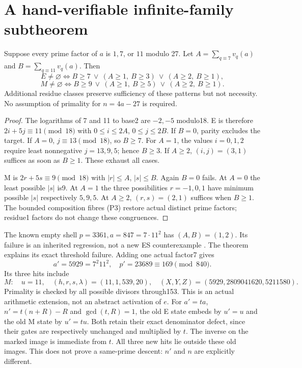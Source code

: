 \section{A hand-verifiable infinite-family subtheorem}
\begin{theorem}
Suppose every prime factor of $a$ is $1,7$, or $11$ modulo 27. Let
$A=\sum_{q\equiv7}v_q(a)$ and $B=\sum_{q\equiv11}v_q(a)$. Then
\[
 \boxed{
 E\ne\varnothing\iff
 B\ge7\ \lor\ (A\ge1,\ B\ge3)\ \lor\ (A\ge2,\ B\ge1),}
 \tag{T1}
\]
\[
 \boxed{
 M\ne\varnothing\iff
 B\ge9\ \lor\ (A\ge1,\ B\ge5)\ \lor\ (A\ge2,\ B\ge1).}
 \tag{T2}
\]
Additional residue classes preserve sufficiency of these patterns but not
necessity. No assumption of primality for $n=4a-27$ is required.
\end{theorem}
\begin{proof}
The logarithms of 7 and 11 to base2 are $-2,-5$ modulo18. E is therefore
$2i+5j\equiv11\pmod{18}$ with $0\le i\le2A$, $0\le j\le2B$.
If $B=0$, parity excludes the target. If $A=0$, $j\equiv13\pmod{18}$,
so $B\ge7$. For $A=1$, the values $i=0,1,2$ require least nonnegative
$j=13,9,5$; hence $B\ge3$. If $A\ge2$, $(i,j)=(3,1)$ suffices as soon
as $B\ge1$. These exhaust all cases.

M is $2r+5s\equiv9\pmod{18}$ with $|r|\le A$, $|s|\le B$.
Again $B=0$ fails. At $A=0$ the least possible $|s|$ is9. At $A=1$
the three possibilities $r=-1,0,1$ have minimum possible $|s|$ respectively
$5,9,5$. At $A\ge2$, $(r,s)=(2,1)$ suffices when $B\ge1$.
The bounded composition fibres (P3) restore actual distinct prime factors;
residue1 factors do not change these congruences.
\end{proof}

The known empty shell $p=3361,a=847=7\cdot11^2$ has $(A,B)=(1,2)$.
Its failure is an inherited regression, not a new ES counterexample
\cite[\S2]{Boolean}. The theorem explains its exact threshold failure.
Adding one actual factor7 gives
\[
 a'=5929=7^2 11^2,\quad p'=23689\equiv169\pmod{840}.
\]
Its three hits include
\[
 M:\quad u=11,\quad(h,r,s,\lambda)=(11,1,539,20),
 \quad (X,Y,Z)=(5929,2809041620,5211580).
 \tag{T3}
\]
Primality is checked by all possible divisors through153.
This is an actual arithmetic extension, not an abstract activation of $e$.
For $a'=ta$, $n'=t(n+R)-R$ and $\gcd(t,R)=1$, the old E state embeds by
$u'=u$ and the old M state by $u'=tu$. Both retain their exact denominator
defect, since their gates are respectively unchanged and multiplied by $t$.
The inverse on the marked image is immediate from $t$. All three new hits
lie outside these old images. This does not prove a same-prime descent:
$n'$ and $n$ are explicitly different.

